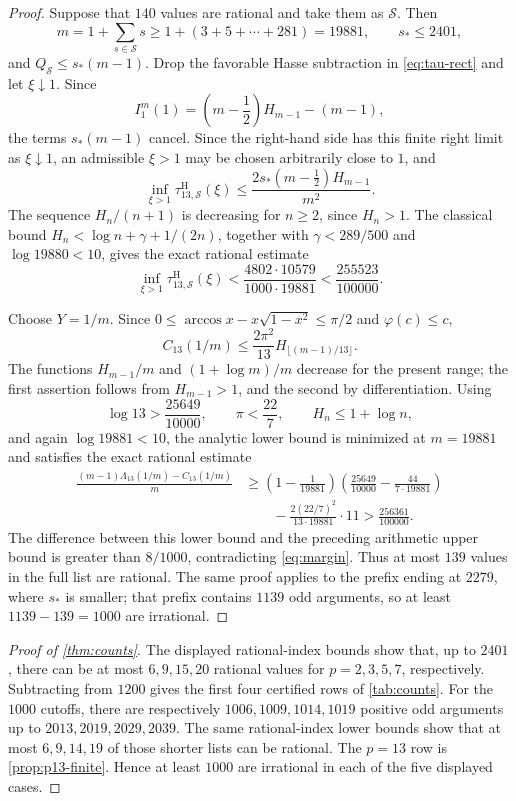 \documentclass[11pt]{article}
\theoremstyle{definition}
\theoremstyle{remark}
\begin{document}
\begin{proof}
Suppose that $140$ values are rational and take them as $\mathcal S$.  Then
\[
 m=1+\sum_{s\in\mathcal S}s\ge1+(3+5+\cdots+281)=19881,
 \qquad s_*\le2401,
\]
and $Q_{\mathcal S}\le s_*(m-1)$.  Drop the favorable Hasse subtraction in
\eqref{eq:tau-rect} and let $\xi\downarrow1$.  Since
\[
 I_1^m(1)=\left(m-\frac12\right)H_{m-1}-(m-1),
\]
the terms $s_*(m-1)$ cancel.  Since the right-hand side has this finite
right limit as $\xi\downarrow1$, an admissible $\xi>1$ may be chosen
arbitrarily close to $1$, and
\begin{equation}\label{eq:p13-tau-bound}
 \inf_{\xi>1}\tau^{\mathrm H}_{13,\mathcal S}(\xi)
 \le\frac{2s_*(m-\tfrac12)H_{m-1}}{m^2}.
\end{equation}
The sequence $H_n/(n+1)$ is decreasing for $n\ge2$, since
$H_n>1$.  The classical bound $H_n<\log n+\gamma+1/(2n)$, together with
$\gamma<289/500$ and $\log19880<10$, gives the exact rational estimate
\[
 \inf_{\xi>1}\tau^{\mathrm H}_{13,\mathcal S}(\xi)
 <\frac{4802\cdot10579}{1000\cdot19881}
 <\frac{255523}{100000}.
\]

Choose $Y=1/m$.  Since
$0\le\arccos x-x\sqrt{1-x^2}\le\pi/2$ and
$\varphi(c)\le c$,
\[
 C_{13}(1/m)
 \le\frac{2\pi^2}{13}H_{\lfloor(m-1)/13\rfloor}.
\]
The functions $H_{m-1}/m$ and $(1+\log m)/m$ decrease for the present range;
the first assertion follows from $H_{m-1}>1$, and the second by differentiation.
Using
\[
 \log13>\frac{25649}{10000},\qquad \pi<\frac{22}{7},\qquad
 H_n\le1+\log n,
\]
and again $\log19881<10$, the analytic lower bound is minimized at
$m=19881$ and satisfies the exact rational estimate
\begin{align*}
 \frac{(m-1)\Lambda_{13}(1/m)-C_{13}(1/m)}m
 &\ge \left(1-\frac1{19881}\right)
       \left(\frac{25649}{10000}-\frac{44}{7\cdot19881}\right)\\
 &\qquad-\frac{2(22/7)^2}{13\cdot19881}\cdot11
 >\frac{256361}{100000}.
\end{align*}
The difference between this lower bound and the preceding arithmetic upper
bound is greater than $8/1000$, contradicting \eqref{eq:margin}.  Thus at most $139$ values in the
full list are rational.  The same proof applies to the prefix ending at
$2279$, where $s_*$ is smaller; that prefix contains $1139$ odd arguments, so
at least $1139-139=1000$ are irrational.
\end{proof}

\begin{proof}[Proof of \cref{thm:counts}]
The displayed rational-index bounds show that, up to $2401$, there can be at
most $6,9,15,20$ rational values for $p=2,3,5,7$, respectively.  Subtracting
from $1200$ gives the first four certified rows of \cref{tab:counts}.  For the
$1000$ cutoffs, there are respectively $1006,1009,1014,1019$ positive odd
arguments up to $2013,2019,2029,2039$.  The same rational-index lower bounds
show that at most $6,9,14,19$ of those shorter lists can be rational.  The
$p=13$ row is \cref{prop:p13-finite}.  Hence at least $1000$ are irrational in
each of the five displayed cases.
\end{proof}
\end{document}

